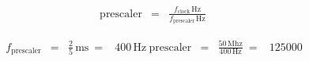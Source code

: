 \documentclass{article}
\begin{document}
\begin{eqnarray*} \mbox{prescaler} & = & \frac{f_{\mbox{clock}}\,\mbox{Hz}}{f_{\mbox{prescaler}}\,\mbox{Hz}}\ \end{eqnarray*}
\pagebreak

\begin{eqnarray*} f_{\mbox{prescaler}} & = & \frac{2}{5}\,\mbox{ms} \ = & 400\,\mbox{Hz} \ \mbox{prescaler} & = & \frac{50\,\mbox{Mhz}}{400\,\mbox{Hz}} \ = & 125000 \end{eqnarray*}
\pagebreak
\end{document}
